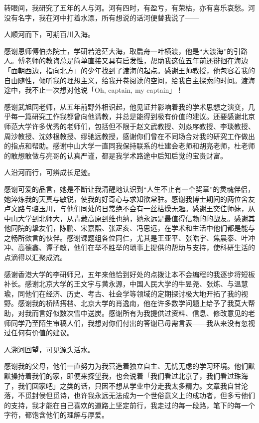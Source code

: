 

\begin{ack}

    转眼间，我研究了五年的人与河。河有四时，有盈亏，有荣枯，亦有喜乐哀愁。河没有名字，我在河中打着水漂，所有想说的话河便替我说了——

    人顺河而下，可期百川入海。
    
    感谢恩师傅伯杰院士，学研若沧茫大海，取扁舟一叶横渡，他是“大渡海”的引路人。傅老师的教诲总是简单直接又具有启发性，帮助我这位五年前还徘徊在海边「面朝西边，指向北方」的少年找到了渡海的起点。感谢王帅教授，他包容着我的自由随性，倾听我的理想主义，给我开卷阅读的空间，给我自主探索的时间。渡海途中，我不止一次想对他说「Oh, captain, my captain」！
    
    感谢武旭同老师，从五年前野外相识起，他见证并影响着我的学术思想之演变，几乎每一篇研究工作我都曾向他请教，并总是能得到极有价值的建议。还要感谢北京师范大学许多优秀的老师们，包括但不限于赵文武教授、刘焱序教授、李琰教授、周沙教授、沈妙根教授、缪驰远教授，感谢你们曾在不同场合对我的研究工作做出的指点和帮助。感谢中山大学一直同我保持联系的杜建会老师和胡亮老师，杜老师的敢想敢做与亮哥的认真严谨，都是我学术路途中后知后觉的宝贵财富。
    
    人沿河而行，可辨成长足迹。
    
    感谢可爱的品言，她是不断让我清醒地认识到“人生不止有一个奖章”的灵魂伴侣，她淬炼我的天真与敏锐，使我的好奇心与求知欲常驻。感谢我博士期间的两位舍友卢文路与骆玉川，与他们同处的日常绝不会有一丝枯燥无趣。感谢王奕佳师妹，从中山大学到北师大，从青藏高原到维也纳，她永远是最值得信赖的的战友。感谢其他同院的挚友们，陈鹏、宋嘉熙、张疋亥、冯思远，在学术和生活中他们都是能与之畅所欲言的伙伴。感谢课题组各位同仁，尤其是王亚平、张皓宇、焦晨泰、叶冲冲、高德鑫、谭子敏，他们在举不胜举的琐事上提供的帮助与支持，使科研生活的点滴得以汇聚成流。
    
    感谢香港大学的李研师兄，五年来他恰到好处的点拨让本不会编程的我逐步将短板补长。感谢北京大学的王文宇与黄永源，中国人民大学的牛昱尧、张炼、与温慧瑜，同他们在经济、历史、考古、社会学等领域的定期探讨极大地开拓了我的视野。感谢我的桥牌搭档、北京大学的肖逸南，他在许多数学问题上给予了我莫大帮助，对我而言好似数次雪中送炭。感谢所有为我提供过资料、信息、修改意见的老师同学乃至陌生审稿人们，我想对你们付出的答谢已毋需言表——我从来没有忽视过任何有价值的建议。
    
    人溯河回望，可见源头活水。
    
    感谢我的父母，他们一直努力为我营造着独立自主、无忧无虑的学习环境。他们默默操持着我们的家，即便来探望我，也会说着「我们看过北京了，我们看过珠海了，我们回家吧」之类的话，只因不想从学业中分走我太多精力。文章我自甘沦落，不觅封侯但觅诗，也许我永远无法成为一个世俗意义上的成功者，但多亏他们的支持，我才能在自己喜欢的道路上坚定前行，我走过的每一段路，笔下的每一个字符，都饱含他们的理解与厚爱。
    

\end{ack}
